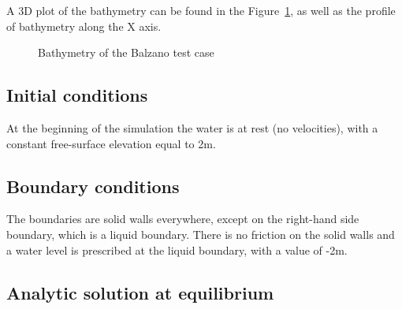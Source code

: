 A 3D plot of the bathymetry can be found in the Figure~\ref{fig:balzano:bathy},
as well as the profile of bathymetry along the X axis.

\begin{figure}[h!]
\begin{minipage}[t]{0.45\textwidth}
 \centering
\end{minipage}%
\begin{minipage}[t]{0.55\textwidth}
 \centering
\end{minipage}
\caption{Bathymetry of the Balzano test case}\label{fig:balzano:bathy}
\end{figure}

%

\subsection{Initial conditions}

At the beginning of the simulation the water is at rest (no velocities), with a constant free-surface elevation equal to 2m.

\subsection{Boundary conditions}

The boundaries are solid walls everywhere, except on the right-hand side boundary, which is a liquid boundary.
There is no friction on the solid walls and a water level is prescribed at the liquid boundary, with a value of -2m.

\subsection{Analytic solution at equilibrium}

